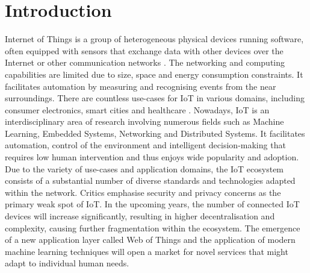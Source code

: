 \documentclass[conference, 11pt]{IEEEtran}
\begin{document}
    \section{Introduction}
    Internet of Things is a group of heterogeneous physical devices running software, often equipped with sensors that exchange data with other devices over the Internet or other communication networks \cite{article:4}.
    The networking and computing capabilities are limited due to size, space and energy consumption constraints.
    It facilitates automation by measuring and recognising events from the near surroundings.
    There are countless use-cases for IoT in various domains, including consumer electronics, smart cities and healthcare \cite{article:1}.
    Nowadays, IoT is an interdisciplinary area of research involving numerous fields such as Machine Learning, Embedded Systems, Networking and Distributed Systems.
    It facilitates automation, control of the environment and intelligent decision-making that requires low human intervention and thus enjoys wide popularity and adoption.
    Due to the variety of use-cases and application domains, the IoT ecosystem consists of a substantial number of diverse standards and technologies adapted within the network.
    Critics emphasise security and privacy concerns as the primary weak spot of IoT.
    In the upcoming years, the number of connected IoT devices will increase significantly, resulting in higher decentralisation and complexity, causing further fragmentation within the ecosystem.
    The emergence of a new application layer called Web of Things and the application of modern machine learning techniques will open a market for novel services that might adapt to individual human needs.
\end{document}
